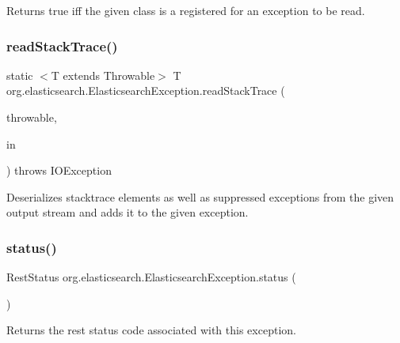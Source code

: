 Returns {\ttfamily true} iff the given class is a registered for an exception to be read. \hypertarget{classorg_1_1elasticsearch_1_1_elasticsearch_exception_a5f0e567c795fbee6a3e7f475f0e88863}{}\label{classorg_1_1elasticsearch_1_1_elasticsearch_exception_a5f0e567c795fbee6a3e7f475f0e88863} 
\subsubsection{\texorpdfstring{read\+Stack\+Trace()}{readStackTrace()}}
{\footnotesize\ttfamily static $<$T extends Throwable$>$ T org.\+elasticsearch.\+Elasticsearch\+Exception.\+read\+Stack\+Trace (\begin{DoxyParamCaption}\item[{T}]{throwable,  }\item[{Stream\+Input}]{in }\end{DoxyParamCaption}) throws I\+O\+Exception\hspace{0.3cm}{\ttfamily [static]}}

Deserializes stacktrace elements as well as suppressed exceptions from the given output stream and adds it to the given exception. \hypertarget{classorg_1_1elasticsearch_1_1_elasticsearch_exception_ad9c404eb416b323496900d737183875e}{}\label{classorg_1_1elasticsearch_1_1_elasticsearch_exception_ad9c404eb416b323496900d737183875e} 
\subsubsection{\texorpdfstring{status()}{status()}}
{\footnotesize\ttfamily Rest\+Status org.\+elasticsearch.\+Elasticsearch\+Exception.\+status (\begin{DoxyParamCaption}{ }\end{DoxyParamCaption})}

Returns the rest status code associated with this exception. \hypertarget{classorg_1_1elasticsearch_1_1_elasticsearch_exception_a872e01b6335d7cffbe11ed3e6e9a4875}{}\label{classorg_1_1elasticsearch_1_1_elasticsearch_exception_a872e01b6335d7cffbe11ed3e6e9a4875} 
